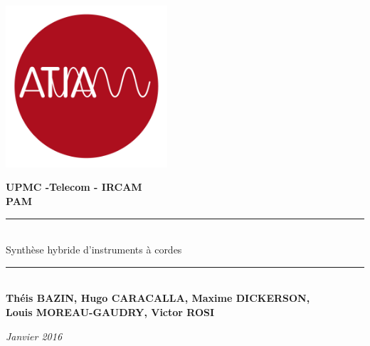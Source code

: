 \thispagestyle{empty}
\addtolength{\hoffset}{-.5cm}
\addtolength{\textheight}{1cm}


\centering
\begin{center}
\includegraphics[width = 6cm]{figures/ATIAM_logo_ROND_RVB.jpg}
\end{center}

\begin{center}

{\large \bf UPMC -Telecom - IRCAM\\}
\vspace{5pt}
\vfill
\vspace{5pt}
\vfill
{\huge \bf PAM\\}
\vspace{5pt}
\vfill
\vspace{8pt}
\rule[2mm]{60mm}{0.2mm}\\
{\Huge Synthèse hybride d'instruments à cordes\\}
\rule[-2mm]{60mm}{0.2mm}\\
\vfill
\vspace{10pt}
\vfill
{\large \bf Théis BAZIN, Hugo CARACALLA, Maxime DICKERSON, \\ \vspace{2mm}  Louis MOREAU-GAUDRY, Victor ROSI}
\vfill

\vfill
\textit{Janvier 2016}
\vfill

\end{center}
